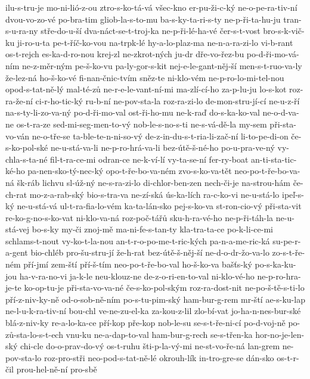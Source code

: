 ilu-s-tru-je
mo-ni-lió-z-ou
ztro-s-ko-tá-vá
všec-kno
er-pu-ži-c-ký
ne-o-pe-ra-tiv-ní
dvou-vo-zo-vé
po-bra-tim
gliob-la-s-to-mu
ba-s-ky-ta-ri-s-ty
ne-p-ři-ta-hu-ju
tran-s-u-ra-ny
stře-do-u-ší
dva-náct-se-t-troj-ka
ne-p-ři-lé-ha-vé
čer-s-t-vost
bro-s-k-vič-ku
ji-ro-u-ta
pe-t-říč-ko-vou
na-trpk-lé
hy-a-lo-plaz-ma
ne-n-a-ra-zi-lo
vi-b-rant
os-t-rejch
es-ka-d-ro-nou
krej-zl
ne-zkrot-ných
ju-dr
dře-vo-řez-bu
po-d-ři-mo-vá-ním
ne-z-měr-ným
pe-š-ko-vu
pa-ly-gor-s-kit
nej-e-le-gant-něj-ší
men-s-t-ruo-va-ly
že-lez-ná
ho-š-ko-vé
fi-nan-čnic-tvím
sněz-te
ni-klo-vém
ne-p-ro-lo-mi-tel-nou
opod-s-tat-ně-lý
mal-té-zů
ne-r-e-le-vant-ní-mi
ma-zlí-cí-ho
za-p-lu-ju
lo-s-kot
roz-ra-že-ní
ci-r-ho-tic-ký
ru-b-ní
ne-pov-sta-la
roz-ra-zi-lo
de-mon-stru-jí-cí
ne-u-z-ří
na-s-ty-li-zo-va-ný
po-d-ři-mo-val
ost-ři-ho-mu
ne-k-raď
do-s-ka-ko-val
ne-o-d-va-ne
os-t-ra-ze
sed-mi-seg-men-to-vý
nob-le-s-no-s-ti
ne-s-vá-dě-la
my-sem
při-sta-vo-ván
ne-o-tře-se
ta-ble-te-n-ni-so-vý
de-z-in-du-s-t-ria-li-zač-ní
li-to-pe-di-on
če-s-ko-pol-ské
ne-u-stá-va-li
ne-p-ro-hrá-va-li
bez-útě-š-né-ho
po-u-pra-ve-ný
vy-chla-s-ta-né
fil-t-ra-ce-mi
odran-ce
ne-k-ví-lí
vy-ta-se-ní
fer-ry-boat
an-ti-sta-tic-ké-ho
pa-nen-sko-tý-nec-ký
opo-t-ře-bo-va-ném
zvo-s-ko-va-tět
neo-po-t-ře-bo-va-ná
šk-ráb
lichvu
sl-úž-ný
ne-s-ra-zi-lo
di-chlor-ben-zen
nech-či-je
na-strou-hám
če-ch-rat
mo-z-a-rab-ský
bio-s-tra-va
ne-zí-ská
ús-ka-lích
ra-c-ko-vi
ne-u-stá-lo
ipeľ-s-ký
ne-u-stá-vá
ul-t-ra-fia-lo-vém
ka-ta-lán-sko
pej-s-ko-va
st-ron-cio-vý
při-sta-vit
re-ko-g-no-s-ko-vat
ni-klo-va-ná
roz-poč-tářů
sku-h-ra-vé-ho
ne-p-ři-táh-la
ne-u-stá-vej
bo-s-ky
my-či
znoj-mě
ma-ni-fe-s-tan-ty
kla-tra-ta-ce
po-k-li-ce-mi
schlams-t-nout
vy-ko-t-la-nou
an-t-r-o-po-me-t-ric-kých
pa-n-a-me-ric-ká
su-pe-r-a-gent
bio-chléb
pro-šu-stru-jí
že-h-rat
bez-útě-š-něj-ší
ne-d-o-dr-žo-va-lo
zo-s-t-ře-ném
pří-jmí
zem-ští
pří-š-tím
neo-po-t-ře-bo-val
ho-š-ko-va
bašťs-ký
po-s-ka-ku-jou
ha-v-ra-no-vi
ja-k-le
neu-klouz-ne
de-z-o-ri-en-to-val
ni-klo-vé-ho
ne-p-ro-hra-je-te
ko-op-tu-je
při-sta-vo-va-né
če-s-ko-pol-ským
roz-ra-dost-nit
ne-po-š-tě-s-ti-lo
pří-z-niv-ky-ně
od-o-sob-ně-ním
po-s-tu-pim-ský
ham-bur-g-rem
mr-ští
ae-s-ku-lap
ne-l-u-k-ra-tiv-ní
bou-chl
ve-ne-zu-el-ka
za-kou-z-lil
zlo-bí-vat
jo-ha-n-nes-bur-ské
blá-z-niv-ky
re-a-lo-ka-ce
pří-kop
pře-kop
nob-le-su
se-s-t-ře-ni-cí
po-d-voj-ně
po-zů-sta-lo-s-t-ech
vnu-ku
ne-a-dap-to-val
ham-bur-g-rech
se-s-třen-ka
hor-no-je-len-ský
chi-cle
do-o-prav-do-vý
os-t-ruhu
šti-p-la-vý-mi
ne-st-vo-ře-ná
lan-grem
ne-pov-sta-lo
roz-pro-stři
neo-pod-s-tat-ně-lé
okrouh-lík
in-tro-gre-se
dán-sko
os-t-r-čil
prou-hel-ně-ní
pro-sbě
